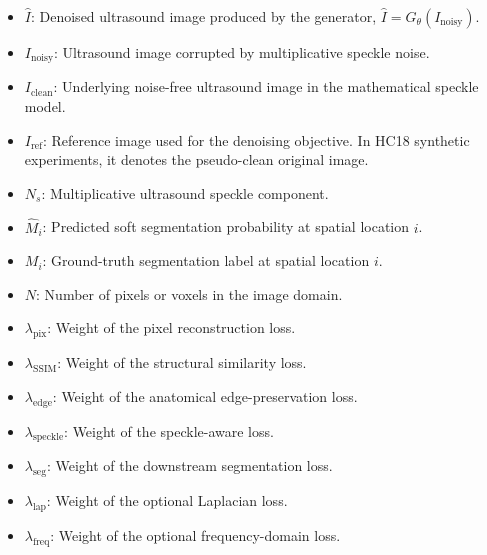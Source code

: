 \documentclass[conference]{IEEEtran}
\begin{document}
\begin{itemize}

    \item $\hat I$: Denoised ultrasound image produced by the
    generator, $\hat I=G_{\theta}(I_{\mathrm{noisy}})$.

    \item $I_{\mathrm{noisy}}$: Ultrasound image corrupted by
    multiplicative speckle noise.

    \item $I_{\mathrm{clean}}$: Underlying noise-free ultrasound
    image in the mathematical speckle model.

    \item $I_{\mathrm{ref}}$: Reference image used for the denoising
    objective. In HC18 synthetic experiments, it denotes the
    pseudo-clean original image.

    \item $N_s$: Multiplicative ultrasound speckle component.

    \item $\hat M_i$: Predicted soft segmentation probability at
    spatial location $i$.

    \item $M_i$: Ground-truth segmentation label at spatial
    location $i$.

    \item $N$: Number of pixels or voxels in the image domain.

    \item $\lambda_{\mathrm{pix}}$: Weight of the pixel reconstruction
    loss.

    \item $\lambda_{\mathrm{SSIM}}$: Weight of the structural
    similarity loss.

    \item $\lambda_{\mathrm{edge}}$: Weight of the anatomical
    edge-preservation loss.

    \item $\lambda_{\mathrm{speckle}}$: Weight of the speckle-aware
    loss.

    \item $\lambda_{\mathrm{seg}}$: Weight of the downstream
    segmentation loss.

    \item $\lambda_{\mathrm{lap}}$: Weight of the optional
    Laplacian loss.

    \item $\lambda_{\mathrm{freq}}$: Weight of the optional
    frequency-domain loss.


\end{itemize}
\end{document}
